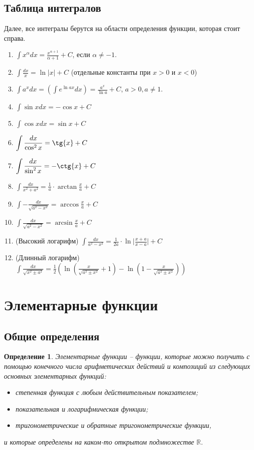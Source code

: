 \documentclass{article}
\theoremstyle{plain}
\newtheorem{definition}{Определение}
\theoremstyle{definition}
\theoremstyle{remark}
\begin{document}
\subsection{Таблица интегралов}
Далее, все интегралы берутся на области определения функции, которая стоит справа.
\begin{enumerate}
    \item $\displaystyle \int x^{\alpha}dx = \frac{x^{\alpha + 1}}{\alpha + 1} + C$, если $\alpha \neq -1$.
    \item $\displaystyle\int \frac{dx}{x} = \ln{|x|} + C$ (отдельные константы при $x > 0$ и $x < 0$)
    \item $\displaystyle\int a^xdx  = \left(\int e^{\ln{a}x}dx \right) = \frac{a^x}{\ln{a}} + C$, $a > 0, a \neq 1.$
    \item $\displaystyle\int \sin{x}dx = -\cos{x} + C$
    \item $\displaystyle\int \cos{x}dx = \sin{x} + C$
    \item $\displaystyle\int \frac{dx}{\cos^2{x}} = \tg{x} + C$
    \item $\displaystyle\int \frac{dx}{\sin^2{x}} = -\ctg{x} + C$
    \item $\displaystyle\int \frac{dx}{x^2 + a^2} = \frac{1}{a} \cdot \arctan{\frac{x}{a}} + C$
    \item $\displaystyle\int -\frac{dx}{\sqrt{a^2 - x^2}} = \arccos{\frac{x}{a}} + C$
    \item $\displaystyle\int \frac{dx}{\sqrt{a^2 - x^2}} = \arcsin{\frac{x}{a}} + C$
    \item (Высокий логарифм) $\displaystyle\int \frac{dx}{a^2 - x^2} = \frac{1}{2a} \cdot \ln{\Big|\frac{x+a}{x-a}\Big|} + C$ 
    \item (Длинный логарифм) $\displaystyle\int \frac{dx}{\sqrt{x^2 \pm a^2}} = \frac{1}{2}\left(\ln{\left(\frac{x}{\sqrt{a^2 \pm x^2}} + 1\right)} - \ln{\left(1 - \frac{x}{\sqrt{a^2 \pm x^2}}\right)}\right)$
\end{enumerate}

\section{Элементарные функции}
\subsection{Общие определения}
\begin{definition}
Элементарные функции -- функции, которые можно получить с помощью конечного числа арифметических действий и композиций из следующих основных элементарных функций:
\begin{itemize}
    \item степенная функция с любым действительным показателем;
    \item показательная и логарифмическая функции;
    \item тригонометрические и обратные тригонометрические функции,
\end{itemize}
и которые определены на каком-то открытом подмножестве $\mathbb{R}.$
\end{definition}
\end{document}
